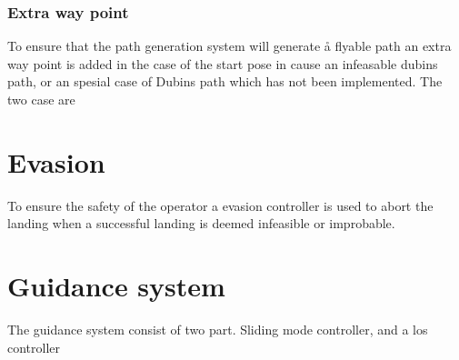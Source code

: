 \subsubsection{Extra way point}
To ensure that the path generation system will generate å flyable path an extra way point is added in the case of the start pose in cause an infeasable dubins path, or an spesial case of Dubins path which has not been implemented. The two case are
\begin{subequations}
\end{subequations}
\section{Evasion}
To ensure the safety of the operator a evasion controller is used to abort the landing when a successful landing is deemed infeasible or improbable.

\section{Guidance system}
The guidance system consist of two part. Sliding mode controller, and a los controller

